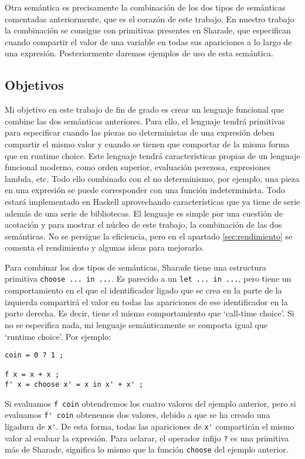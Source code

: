 \documentclass[class=article, crop=false]{standalone}
\begin{document}
Otra semántica es precisamente la combinación de los dos tipos de semánticas comentadas
anteriormente, que es el corazón de este trabajo. En nuestro trabajo la combinación se
consigue con primitivas presentes en Sharade, que especifican cuando compartir el valor de
una variable en todas sus apariciones a lo largo de una expresión. Posteriormente daremos
ejemplos de uso de esta semántica.

\subsection{Objetivos}
Mi objetivo en este trabajo de fin de grado es crear un lenguaje funcional que combine las
dos semánticas anteriores. Para ello, el lenguaje tendrá primitivas para especificar cuando
las piezas no deterministas de una expresión deben compartir el mismo valor y cuando se
tienen que comportar de la misma forma que en runtime choice. Este lenguaje tendrá
características propias de un lenguaje funcional moderno, como orden superior, evaluación
perezosa, expresiones lambda, etc. Todo ello combinado con el no determinismo, por ejemplo,
una pieza en una expresión se puede corresponder con una función indeterminista. Todo estará
implementado en Haskell aprovechando características que ya tiene de serie además de una
serie de bibliotecas. El lenguaje es simple por una cuestión de acotación y para mostrar el
núcleo de este trabajo, la combinación de las dos semánticas. No se persigue la eficiencia,
pero en el apartado \ref{sec:rendimiento} se comenta el rendimiento y algunas ideas para
mejorarlo.

Para combinar los dos tipos de semánticas, Sharade tiene una estructura primitiva
\verb`choose ... in ...`. Es parecido a un \verb`let ... in ...`, pero tiene un
comportamiento en el que el identificador ligado que se crea en la parte de la izquierda
compartirá el valor en todas las apariciones de ese identificador en la parte derecha. Es
decir, tiene el mismo comportamiento que `call-time choice'. Si no se especifica nada, mi
lenguaje semánticamente se comporta igual que `runtime choice'. Por ejemplo:

\begin{verbatim}
coin = 0 ? 1 ;

f x = x + x ;
f' x = choose x' = x in x' + x' ;
\end{verbatim}

Si evaluamos \verb`f coin` obtendremos los cuatro valores del ejemplo anterior, pero si
evaluamos \verb`f' coin` obtenemos dos valores, debido a que se ha creado una ligadura de
\verb`x'`. De esta forma, todas las apariciones de \verb`x'` compartirán el mismo valor al
evaluar la expresión. Para aclarar, el operador infijo \verb`?` es una primitiva más de
Sharade, significa lo mismo que la función \verb`choose` del ejemplo anterior.
\end{document}
